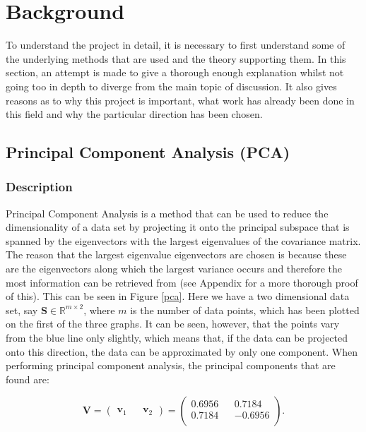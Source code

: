 \documentclass[11pt,a4paper]{article}
\begin{document}
\section{Background}
To understand the project in detail, it is necessary to first understand some of the underlying methods that are used and the theory supporting them. In this section, an attempt is made to give a thorough enough explanation whilst not going too in depth to diverge from the main topic of discussion. It also gives reasons as to why this project is important, what work has already been done in this field and why the particular direction has been chosen. 




\subsection{Principal Component Analysis (PCA)}
\subsubsection{Description}
Principal Component Analysis is a method that can be used to reduce the dimensionality of a data set by projecting it onto the principal subspace that is spanned by the eigenvectors with the largest eigenvalues of the covariance matrix. The reason that the largest eigenvalue eigenvectors are chosen is because these are the eigenvectors along which the largest variance occurs and therefore the most information can be retrieved from (see Appendix for a more thorough proof of this). This can be seen in Figure \ref{pca}. Here we have a two dimensional data set, say $\mathbf{S} \in \mathbb{R}^{m \times 2}$, where $m$ is the number of data points, which has been plotted on the first of the three graphs. It can be seen, however, that the points vary from the blue line only slightly, which means that, if the data can be projected onto this direction, the data can be approximated by only one component. When performing principal component analysis, the principal components that are found are:

\begin{equation*}
\mathbf{V} = 
\begin{pmatrix}
\mathbf{v}_1 && \mathbf{v}_2
\end{pmatrix} = 
\begin{pmatrix}
0.6956 && 0.7184\\
 0.7184 && -0.6956\\
\end{pmatrix}.
\end{equation*}
\end{document}
